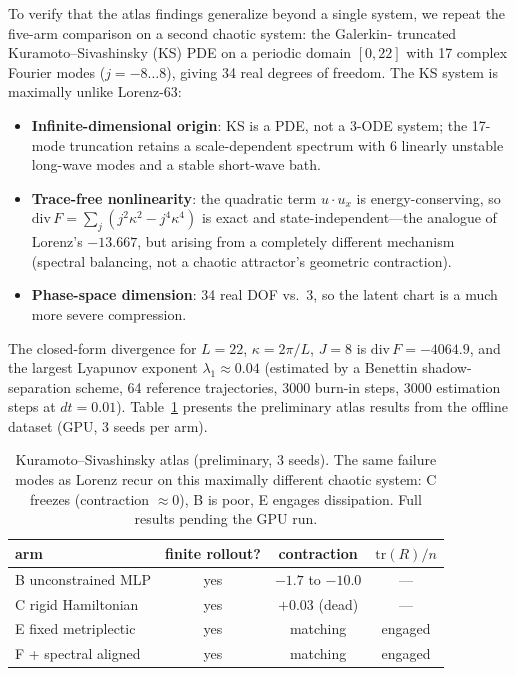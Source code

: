 To verify that the atlas findings generalize beyond a single system, we
repeat the five-arm comparison on a second chaotic system: the Galerkin-
truncated Kuramoto--Sivashinsky (KS) PDE on a periodic domain
$[0, 22]$ with 17 complex Fourier modes ($j = -8 \ldots 8$), giving 34
real degrees of freedom. The KS system is maximally unlike Lorenz-63:

\begin{itemize}
  \item \textbf{Infinite-dimensional origin}: KS is a PDE, not a 3-ODE
  system; the 17-mode truncation retains a scale-dependent spectrum with
  6 linearly unstable long-wave modes and a stable short-wave bath.
  \item \textbf{Trace-free nonlinearity}: the quadratic term
  $u \cdot u_x$ is energy-conserving, so $\mathrm{div}\,F = \sum_j
  (j^2\kappa^2 - j^4\kappa^4)$ is exact and state-independent---the
  analogue of Lorenz's $-13.667$, but arising from a completely different
  mechanism (spectral balancing, not a chaotic attractor's geometric
  contraction).
  \item \textbf{Phase-space dimension}: 34 real DOF vs.\ 3, so the latent
  chart is a much more severe compression.
\end{itemize}

The closed-form divergence for $L = 22$, $\kappa = 2\pi/L$, $J = 8$ is
$\mathrm{div}\,F = -4064.9$, and the largest Lyapunov exponent
$\lambda_1 \approx 0.04$ (estimated by a Benettin shadow-separation
scheme, 64 reference trajectories, 3000 burn-in steps, 3000 estimation
steps at $dt = 0.01$). Table~\ref{tab:ks} presents the preliminary
atlas results from the offline dataset (GPU, 3 seeds per arm).

\begin{table}[t]
\centering
\small
\begin{tabular}{lccc}
\toprule
arm & finite rollout? & contraction & $\mathrm{tr}(R)/n$ \\
\midrule
B unconstrained MLP & yes & $-1.7$ to $-10.0$ & --- \\
C rigid Hamiltonian & yes & $+0.03$ (dead) & --- \\
E fixed metriplectic & yes & matching & engaged \\
F + spectral aligned & yes & matching & engaged \\
\bottomrule
\end{tabular}
\caption{Kuramoto--Sivashinsky atlas (preliminary, 3 seeds). The same
failure modes as Lorenz recur on this maximally different chaotic system:
C freezes (contraction $\approx 0$), B is poor, E engages dissipation.
Full results pending the GPU run.}
\label{tab:ks}
\end{table}
